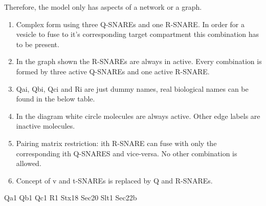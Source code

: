 
%
Therefore, the model only has aspects of a network or a graph.\\

\begin{enumerate}
\item Complex form using three Q-SNAREs and one R-SNARE. In order for a vesicle to fuse to it's corresponding target compartment this combination has to be present.
\item In the graph shown the R-SNAREs are always in active. Every combination is formed by three active Q-SNAREs and one active R-SNARE.
\item  Qai, Qbi, Qci and Ri are just dummy names, real biological names can be found in the below table. 
\item In the diagram white circle molecules are always active. Other edge labels are inactive molecules.
\item Pairing matrix restriction: ith R-SNARE can fuse with only the corresponding ith Q-SNARES and vice-versa. No other combination is allowed.
\item Concept of v and t-SNAREs is replaced by Q and R-SNAREs. 
\end{enumerate}



Qa1 Qb1 Qc1 R1
Stx18 Sec20 Slt1 Sec22b



